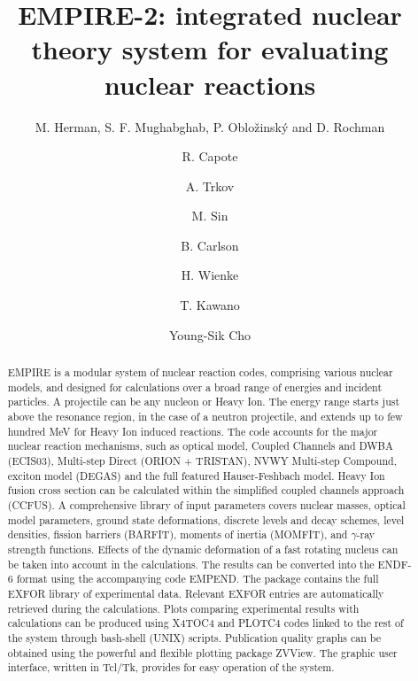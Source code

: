 \documentclass[twocolumn,amsmath,amssymb,10pt,groupedaddress,a4paper]{revtex4}
\begin{document}
\title{EMPIRE-2: integrated nuclear theory system for evaluating nuclear reactions}


\author{M. Herman, S. F. Mughabghab, P. Oblo\v zinsk\'y and D. Rochman}
\author{R. Capote}
\author{A. Trkov }
\author{M. Sin}
\author{B. Carlson}
\author{H. Wienke}
\author{T. Kawano}
\author{Young-Sik Cho}

\begin{abstract}

EMPIRE is a modular system of nuclear reaction codes, comprising various
nuclear models, and designed for calculations over a broad range of
energies and incident particles. A projectile can be any nucleon or
Heavy Ion. The energy range starts just above the resonance region,
in the case of a neutron projectile, and extends up to few hundred
MeV for Heavy Ion induced reactions. The code accounts for the major
nuclear reaction mechanisms, such as optical model, Coupled Channels
and DWBA (ECIS03), Multi-step Direct (ORION + TRISTAN), NVWY Multi-step
Compound, exciton model (DEGAS) and the full featured Hauser-Feshbach
model. Heavy Ion fusion cross section can be calculated within the
simplified coupled channels approach (CCFUS). A comprehensive library
of input parameters covers nuclear masses, optical model parameters,
ground state deformations, discrete levels and decay schemes, level
densities, fission barriers (BARFIT), moments of inertia (MOMFIT),
and $\gamma$-ray strength functions. Effects of the dynamic deformation
of a fast rotating nucleus can be taken into account in the calculations.
The results can be converted into the ENDF-6 format using the accompanying
code EMPEND. The package contains the full EXFOR library of experimental
data. Relevant EXFOR entries are automatically retrieved during the
calculations. Plots comparing experimental results with calculations
can be produced using X4TOC4 and PLOTC4 codes linked to the rest of
the system through bash-shell (UNIX) scripts. Publication quality
graphs can be obtained using the powerful and flexible plotting package
ZVView. The graphic user interface, written in Tcl/Tk, provides for
easy operation of the system.

\end{abstract}
\end{document}
